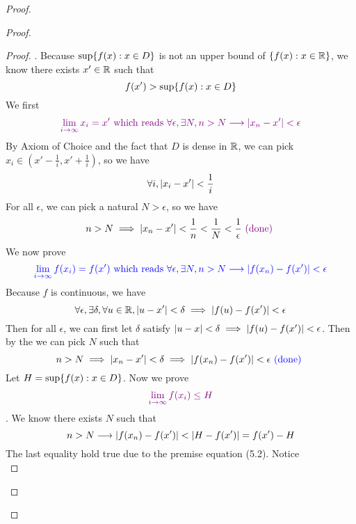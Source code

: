 \documentclass{report}
\begin{document}
\begin{proof}
\begin{proof}
\begin{proof}
. Because $\sup \{ f(x):x\in D \}$ is not an upper bound of $\{ f(x):x\in \mathbb{R} \}$, we know there exists $x'\in \mathbb{R}$ such that 
\begin{equation}
f(x')>\sup \{ f(x):x\in D \}
\end{equation}
We first  
\begin{equation}
  \textcolor{violet}{\lim_{i\to \infty}x_i=x'\text{ which reads } \forall \epsilon, \exists N, n>N \longrightarrow \left|x_n - x'\right|<\epsilon}
\end{equation}
By Axiom of Choice and the fact that $D$ is dense in  $\mathbb{R}$, we can pick $x_i \in (x'- \frac{1}{i},x' +\frac{1}{i})$, so we have
\begin{equation}
\forall i, \left|x_i-x'\right|<\frac{1}{i}
\end{equation}
For all $\epsilon $, we can pick a natural $N>\epsilon $, so we have 
\begin{equation}
n>N\implies \left|x_n-x'\right|<\frac{1}{n}<\frac{1}{N}<\frac{1}{\epsilon }\textcolor{violet}{\text{ (done) }}
\end{equation}
We now prove 
\begin{equation}
\textcolor{blue}{\lim_{i\to\infty}f(x_i)=f(x')\text{ which reads }\forall \epsilon , \exists N, n>N\longrightarrow  \left|f(x_n)-f(x')\right|<\epsilon }
\end{equation}
Because $f$ is continuous, we have 
\begin{equation}
  \forall \epsilon ,\exists \delta, \forall u\in \mathbb{R}, \left|u-x'\right|<\delta\implies \left|f(u)-f(x')\right|<\epsilon  
\end{equation}
Then for all $\epsilon $, we can first let $\delta$ satisfy $\left|u-x\right|<\delta \implies \left|f(u)-f(x')\right|<\epsilon $. Then by the  we can pick $N$ such that 
\begin{equation}
n>N\implies \left|x_n - x'\right|< \delta \implies \left|f(x_n)-f(x')\right|<\epsilon \textcolor{blue}{\text{ (done) }} 
\end{equation}
Let $H=\sup \{ f(x): x\in D \}$. Now we prove  
\begin{equation}
  \textcolor{violet}{\lim_{i \to \infty}f(x_i)\leq H}
\end{equation}
. We know there exists $N$ such that 
\begin{equation}
n>N\longrightarrow \left|f(x_n)-f(x')\right|<\left|H - f(x') \right|=f(x')-H
\end{equation}
The last equality hold true due to the premise equation (5.2). Notice 
\begin{equation}

\end{equation}
\end{proof}
\end{proof}
\end{proof}
\end{document}
